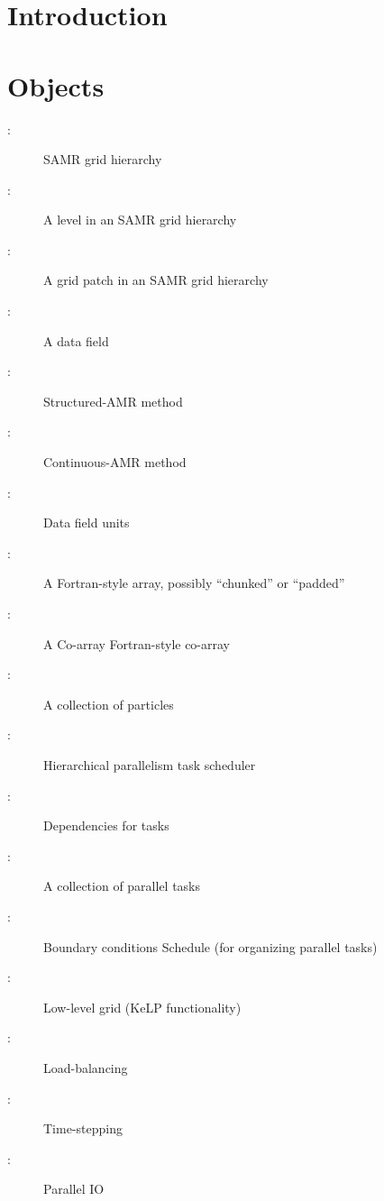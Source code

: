 \documentclass{article}
\begin{document}

\section{Introduction} \label{s:intro}




\section{Objects} \label{s:intro}

\begin{description}
\item[: ] SAMR grid hierarchy
\item[: ]     A level in an SAMR grid hierarchy
\item[: ]      A grid patch in an SAMR grid hierarchy
\item[: ]     A data field
\item[: ]  Structured-AMR method
\item[: ]   Continuous-AMR method
\item[: ]     Data field units
\item[: ]     A Fortran-style array, possibly ``chunked'' or ``padded''
\item[: ]   A Co-array Fortran-style co-array
\item[: ] A collection of particles
\item[: ]  Hierarchical parallelism task scheduler
\item[: ] Dependencies for tasks
\item[: ]     A collection of parallel tasks
\item[: ]        Boundary conditions
      Schedule (for organizing parallel tasks)
\item[: ]       Low-level grid (KeLP functionality)
\item[: ]    Load-balancing
\item[: ] Time-stepping
\item[: ]         Parallel IO
\end{description}
\end{document}
